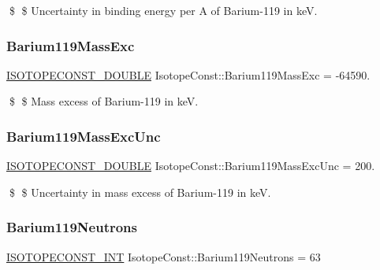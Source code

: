 \$ \$ Uncertainty in binding energy per A of Barium-\/119 in keV. \mbox{\label{group___isotope_const-_barium-_ba119_ga73a0647d3a542e3767c1d1653628681c}} 
\subsubsection{\texorpdfstring{Barium119\+Mass\+Exc}{Barium119MassExc}}
{\footnotesize\ttfamily \mbox{\hyperlink{group___isotope_const-_macros_ga8f45a7272ce02c0b4c65c44636ed719a}{I\+S\+O\+T\+O\+P\+E\+C\+O\+N\+S\+T\+\_\+\+D\+O\+U\+B\+LE}} Isotope\+Const\+::\+Barium119\+Mass\+Exc = -\/64590.}

\$ \$ Mass excess of Barium-\/119 in keV. \mbox{\label{group___isotope_const-_barium-_ba119_ga27df7ed41994257b8dbbeb71d844e356}} 
\subsubsection{\texorpdfstring{Barium119\+Mass\+Exc\+Unc}{Barium119MassExcUnc}}
{\footnotesize\ttfamily \mbox{\hyperlink{group___isotope_const-_macros_ga8f45a7272ce02c0b4c65c44636ed719a}{I\+S\+O\+T\+O\+P\+E\+C\+O\+N\+S\+T\+\_\+\+D\+O\+U\+B\+LE}} Isotope\+Const\+::\+Barium119\+Mass\+Exc\+Unc = 200.}

\$ \$ Uncertainty in mass excess of Barium-\/119 in keV. \mbox{\label{group___isotope_const-_barium-_ba119_ga8210eca65f8c93b7c3b1941589cb1b1a}} 
\subsubsection{\texorpdfstring{Barium119\+Neutrons}{Barium119Neutrons}}
{\footnotesize\ttfamily \mbox{\hyperlink{group___isotope_const-_macros_ga5f18360b3e99483a35c32d789e62621c}{I\+S\+O\+T\+O\+P\+E\+C\+O\+N\+S\+T\+\_\+\+I\+NT}} Isotope\+Const\+::\+Barium119\+Neutrons = 63}

